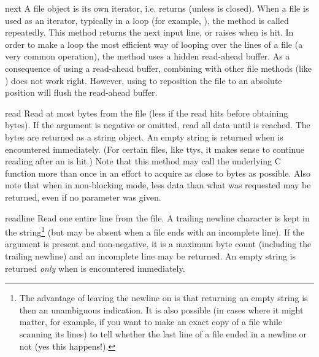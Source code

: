 \begin{methoddesc}[file]{next}{}
A file object is its own iterator, i.e.  returns
 (unless  is closed).  When a file is used as an
iterator, typically in a  loop (for example,
), the  method is
called repeatedly.  This method returns the next input line, or raises
 when \EOF{} is hit.  In order to make a
 loop the most efficient way of looping over the lines of
a file (a very common operation), the  method uses a
hidden read-ahead buffer.  As a consequence of using a read-ahead
buffer, combining  with other file methods (like
) does not work right.  However, using
 to reposition the file to an absolute position will
flush the read-ahead buffer.
\end{methoddesc}

\begin{methoddesc}[file]{read}{}
  Read at most  bytes from the file (less if the read hits
  \EOF{} before obtaining  bytes).  If the 
  argument is negative or omitted, read all data until \EOF{} is
  reached.  The bytes are returned as a string object.  An empty
  string is returned when \EOF{} is encountered immediately.  (For
  certain files, like ttys, it makes sense to continue reading after
  an \EOF{} is hit.)  Note that this method may call the underlying
  C function  more than once in an effort to
  acquire as close to  bytes as possible. Also note that
  when in non-blocking mode, less data than what was requested may
  be returned, even if no  parameter was given.
\end{methoddesc}

\begin{methoddesc}[file]{readline}{}
  Read one entire line from the file.  A trailing newline character is
  kept in the string\footnote{
	The advantage of leaving the newline on is that
	returning an empty string is then an unambiguous \EOF{}
	indication.  It is also possible (in cases where it might
	matter, for example, if you
	want to make an exact copy of a file while scanning its lines)
	to tell whether the last line of a file ended in a newline
	or not (yes this happens!).
  } (but may be absent when a file ends with an
  incomplete line).  If the  argument is present and
  non-negative, it is a maximum byte count (including the trailing
  newline) and an incomplete line may be returned.
  An empty string is returned \emph{only} when \EOF{} is encountered
  immediately.  
\end{methoddesc}

